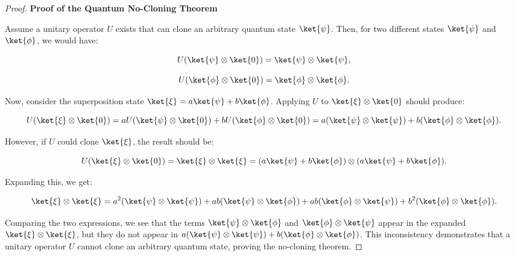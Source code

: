 \begin{proof}
  \textbf{Proof of the Quantum No-Cloning Theorem}

  Assume a unitary operator $U$ exists that can clone an arbitrary quantum
  state $\ket{\psi}$. Then, for two different states $\ket{\psi}$ and
  $\ket{\phi}$, we would have:

  \[
    U(\ket{\psi} \otimes \ket{0}) = \ket{\psi} \otimes \ket{\psi},
  \]

  \[
    U(\ket{\phi} \otimes \ket{0}) = \ket{\phi} \otimes \ket{\phi}.
  \]

  Now, consider the superposition state $\ket{\xi} = a\ket{\psi} +
  b\ket{\phi}$. Applying $U$ to $\ket{\xi} \otimes \ket{0}$ should produce:

  \[
    U(\ket{\xi} \otimes \ket{0}) = aU(\ket{\psi} \otimes \ket{0}) +
    bU(\ket{\phi} \otimes \ket{0}) = a(\ket{\psi} \otimes \ket{\psi}) +
    b(\ket{\phi} \otimes \ket{\phi}).
  \]

  However, if $U$ could clone $\ket{\xi}$, the result should be:

  \[
    U(\ket{\xi} \otimes \ket{0}) = \ket{\xi} \otimes \ket{\xi} = (a\ket{\psi}
    + b\ket{\phi}) \otimes (a\ket{\psi} + b\ket{\phi}).
  \]

  Expanding this, we get:

  \[
    \ket{\xi} \otimes \ket{\xi} = a^2(\ket{\psi} \otimes \ket{\psi}) +
    ab(\ket{\psi} \otimes \ket{\phi}) + ab(\ket{\phi} \otimes \ket{\psi}) +
    b^2(\ket{\phi} \otimes \ket{\phi}).
  \]

  Comparing the two expressions, we see that the terms $\ket{\psi} \otimes
  \ket{\phi}$ and $\ket{\phi} \otimes \ket{\psi}$ appear in the expanded
  $\ket{\xi} \otimes \ket{\xi}$, but they do not appear in $a(\ket{\psi}
  \otimes \ket{\psi}) + b(\ket{\phi} \otimes \ket{\phi})$. This inconsistency
  demonstrates that a unitary operator $U$ cannot clone an arbitrary quantum
  state, proving the no-cloning theorem.
\end{proof}

